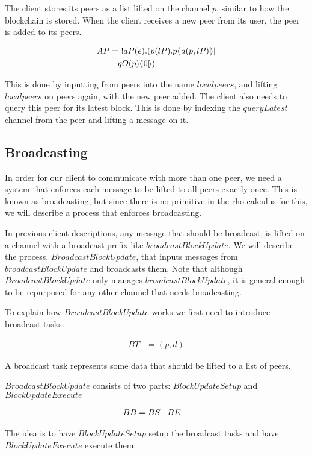 The client stores its peers as a list lifted on the channel $p$, similar to how the blockchain is stored.
When the client receives a new peer from its user, the peer is added to its peers.

\begin{align*}
    AP &=\ !aP(e).(p(lP).p \langle \! | a(p,lP) | \! \rangle|\\
        &\quad qO(p) \langle \! | 0 | \! \rangle)\\
\end{align*}

This is done by inputting from peers into the name $localpeers$, and lifting $localpeers$ on peers again, with the new peer added.
The client also needs to query this peer for its latest block.
This is done by indexing the $queryLatest$ channel from the peer and lifting a message on it.

\subsection{Broadcasting}
In order for our client to communicate with more than one peer, we need a system that enforces each message to be lifted to all peers exactly once. This is known as broadcasting, but since there is no primitive in the rho-calculus for this, we will describe a process that enforces broadcasting.

In previous client descriptions, any message that should be broadcast, is lifted on a channel with a broadcast prefix like $broadcastBlockUpdate$.
We will describe the process, $BroadcastBlockUpdate$, that inputs messages from $broadcastBlockUpdate$ and broadcasts them.
Note that although $BroadcastBlockUpdate$ only manages $broadcastBlockUpdate$, it is general enough to be repurposed for any other channel that needs broadcasting.

To explain how $BroadcastBlockUpdate$ works we first need to introduce broadcast tasks.

\begin{align*}
    BT &= (p, d)
\end{align*}

A broadcast task represents some data that should be lifted to a list of peers.

$BroadcastBlockUpdate$ consists of two parts: $BlockUpdateSetup$ and $BlockUpdateExecute$

\begin{align*}
    BB &= BS \mid BE
\end{align*}

The idea is to have $BlockUpdateSetup$ setup the broadcast tasks and have $BlockUpdateExecute$ execute them.

